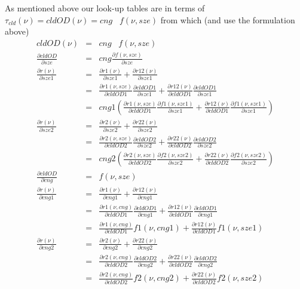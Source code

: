 \documentclass[11pt]{article}
\begin{document}
As mentioned above our look-up tables are in terms of $\tau_{cld}(\nu) = cldOD(\nu) = cng \;\;\; f(\nu,sze)$ from which (and use the formulation above)
\[
\begin{array}{ccc}
\hline
cldOD(\nu) & = & cng \;\;\; f(\nu,sze) \\
\hline
\frac{\partial cldOD}{\partial sze} & = & cng \frac{\partial f(\nu,sze)}{\partial sze} \\
\frac{\partial r(\nu)}{\partial sze1} & = & \frac{\partial r1(\nu)}{\partial sze1} + \frac{\partial r12(\nu)}{\partial sze1} \\
                                      & = & \frac{\partial r1(\nu,sze)}{\partial cldOD1} \frac{\partial cldOD1}{\partial sze1} + \frac{\partial r12(\nu)} {\partial cldOD1} \frac{\partial cldOD1}{\partial sze1} \\
                                      & = & cng1 \left(\frac{\partial r1(\nu,sze)}{\partial cldOD1} \frac{\partial f1(\nu,sze1)}{\partial sze1} + \frac{\partial r12(\nu)} {\partial cldOD1} \frac{\partial f1(\nu,sze1)}{\partial sze1} \right) \\
\frac{\partial r(\nu)}{\partial sze2} & = & \frac{\partial r2(\nu)}{\partial sze2} + \frac{\partial r22(\nu)}{\partial sze2} \\
                                      & = & \frac{\partial r2(\nu,sze)}{\partial cldOD2} \frac{\partial cldOD2}{\partial sze2} + \frac{\partial r22(\nu)} {\partial cldOD2} \frac{\partial cldOD2}{\partial sze2} \\
                                      & = & cng2 \left(\frac{\partial r2(\nu,sze)}{\partial cldOD2} \frac{\partial f2(\nu,sze2)}{\partial sze2} + \frac{\partial r22(\nu)} {\partial cldOD2} \frac{\partial f2(\nu,sze2)}{\partial sze2} \right) \\
\hline
\frac{\partial cldOD}{\partial cng} & = & f(\nu,sze) \\
\frac{\partial r(\nu)}{\partial cng1} & = & \frac{\partial r1(\nu)}{\partial cng1} + \frac{\partial r12(\nu)}{\partial cng1} \\
                                      & = & \frac{\partial r1(\nu,cng)}{\partial cldOD1} \frac{\partial cldOD1}{\partial cng1} + \frac{\partial r12(\nu)} {\partial cldOD1} \frac{\partial cldOD1}{\partial cng1} \\
                                      & = & \frac{\partial r1(\nu,cng)}{\partial cldOD1} f1(\nu,cng1) + \frac{\partial r12(\nu)} {\partial cldOD1} f1(\nu,sze1) \\
\frac{\partial r(\nu)}{\partial cng2} & = & \frac{\partial r2(\nu)}{\partial cng2} + \frac{\partial r22(\nu)}{\partial cng2} \\
                                      & = & \frac{\partial r2(\nu,cng)}{\partial cldOD2} \frac{\partial cldOD2}{\partial cng2} + \frac{\partial r22(\nu)} {\partial cldOD2} \frac{\partial cldOD2}{\partial cng2} \\
                                      & = & \frac{\partial r2(\nu,cng)}{\partial cldOD2} f2(\nu,cng2) + \frac{\partial r22(\nu)} {\partial cldOD2} f2(\nu,sze2) \\
\end{array}
\]
\end{document}
